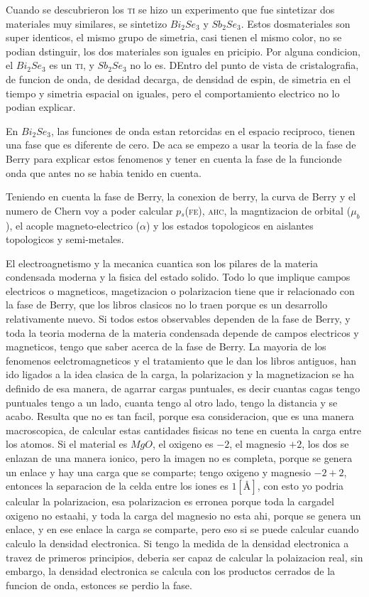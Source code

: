 \documentclass[11pt,fleqn]{book}
\begin{document}
Cuando se descubrieron los \textsc{ti} se hizo un experimento que fue sintetizar dos materiales muy similares, se sintetizo $Bi_{2}Se_{3}$ y $Sb_{2}Se_{3}$. Estos dosmateriales son super identicos, el mismo grupo de simetria, casi tienen el mismo color, no se podian dstinguir, los dos materiales son iguales en pricipio. Por alguna condicion, el $Bi_{2}Se_{3}$ es un \textsc{ti}, y $Sb_{2}Se_{3}$ no lo es. DEntro del punto de vista de cristalografia, de funcion de onda,  de desidad decarga, de densidad de espin, de simetria en el tiempo y simetria espacial on iguales, pero el comportamiento electrico no lo podian explicar. 

En $Bi_{2}Se_{3}$, las funciones de onda estan retorcidas en el espacio reciproco, tienen una fase que es diferente de cero. De aca se empezo a usar la teoria de la fase de Berry para explicar estos fenomenos y tener en cuenta la fase de la funcionde onda que antes no se habia tenido en cuenta. 

Teniendo en cuenta la fase de Berry, la conexion de berry, la curva de Berry y el numero de Chern voy a poder calcular \textsc{$p_{s}$(fe)}, \textsc{ahc}, la magntizacion de orbital ($\mu_{b}$), el acople magneto-electrico ($\alpha$) y los estados topologicos en aislantes topologicos y semi-metales.

El electroagnetismo y la mecanica cuantica son los pilares de la materia condensada moderna y la fisica del estado solido. Todo lo que implique campos electricos o magneticos, magetizacion o polarizacion tiene que ir relacionado con la fase de Berry, que los libros clasicos no lo traen porque es un desarrollo relativamente nuevo. Si todos estos observables dependen de la fase de Berry, y toda la teoria moderna de la materia condensada depende de campos electricos y magneticos, tengo que saber acerca de la fase de Berry. La mayoria de los fenomenos eelctromagneticos y el tratamiento que le dan los libros antiguos, han ido ligados a la idea clasica de la carga, la polarizacion y la magnetizacion se ha definido de esa manera, de agarrar cargas puntuales, es decir cuantas cagas tengo puntuales tengo a un lado, cuanta tengo al otro lado, tengo la distancia y se acabo. Resulta que no es tan facil, porque esa consideracion, que es una manera macroscopica, de calcular estas cantidades fisicas no tene en cuenta la carga entre los atomos. Si el material es $MgO$, el oxigeno es $-2$, el magnesio $+2$, los dos se enlazan de una manera ionico, pero la imagen no es completa, porque se genera un enlace y hay una carga que se comparte; tengo oxigeno y magnesio $-2+2$, entonces la separacion de la celda entre los iones es $1 [\si{\angstrom}]$, con esto yo podria calcular la polarizacion, esa polarizacion es erronea porque toda la cargadel oxigeno no estaahi, y toda la carga del magnesio no esta ahi, porque se genera un enlace, y en ese enlace la carga se comparte, pero eso si se puede calcular cuando calculo la densidad electronica. Si tengo la medida de la densidad electronica a travez de primeros principios, deberia ser capaz de calcular la polaizacion real, sin embargo, la densidad electronica se calcula con los productos cerrados de la funcion de onda, estonces se perdio la fase. 
\end{document}
